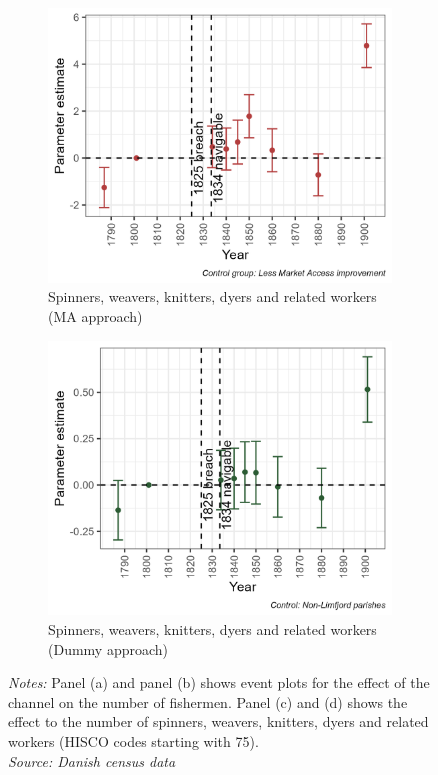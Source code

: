 \begin{figure}
\begin{subfigure}[b]{0.45\textwidth}
    \end{subfigure}
    \vspace{0.45cm}
    \begin{subfigure}[b]{0.45\textwidth}
        \centering
        \caption{Spinners, weavers, knitters, dyers and related workers (MA approach)} \label{fig:spinners_ma}
        \includegraphics[width=\textwidth]{Plots/Mechanism/spinning_MA.png}
    \end{subfigure}
    \hfill
    \begin{subfigure}[b]{0.45\textwidth}
        \centering
        \caption{Spinners, weavers, knitters, dyers and related workers (Dummy approach)} \label{fig:spinners_dummy}
        \includegraphics[width=\textwidth]{Plots/Mechanism/spinning_dummy.png}
    \end{subfigure}
    \parbox{0.9\textwidth}{
    \caption*{\footnotesize \textit{Notes:} Panel (a) and panel (b) shows event plots for the effect of the channel on the number of fishermen. Panel (c) and (d) shows the effect to the number of spinners, weavers, knitters, dyers and related workers (HISCO codes starting with 75).  \\ \textit{Source: Danish census data}}
}
    \label{fig:fishing_spinners}
\end{figure}

